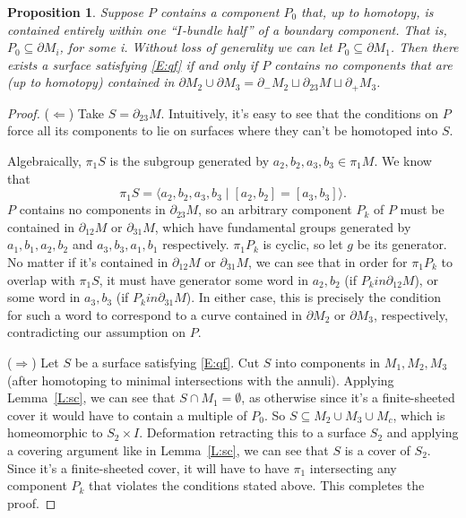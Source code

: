 \documentclass[12pt]{amsart}
\newtheorem{prop}[theorem]{Proposition}
\theoremstyle{definition}
\theoremstyle{remark}
\newcommand{\x}{\times}
\newcommand{\bd}{\partial}
\newcommand{\cin}{\subseteq}
\begin{document}
\begin{prop}

Suppose $P$ contains a component $P_0$ that, up to homotopy, is contained
entirely within one ``$I$-bundle half'' of a boundary component. That is, $P_0
\cin \bd M_i$, for some i. Without loss of generality we can let $P_0 \cin \bd
M_1$.  Then there exists a surface satisfying \eqref{E:qf} if and only if $P$
contains no components that are (up to homotopy) contained in $\bd M_2 \cup \bd
M_3 = \bd_-M_2 \sqcup \bd_{23}M \sqcup \bd_+M_3$.

\end{prop}
\begin{proof}

($\Longleftarrow$) Take $S=\bd_{23}M$. Intuitively, it's easy to see that the
conditions on $P$ force all its components to lie on surfaces where they can't
be homotoped into $S$.

Algebraically, $\pi_1S$ is the subgroup generated by $a_2,b_2,a_3,b_3 \in
\pi_1M$. We know that
\[
\pi_1S = \langle a_2,b_2,a_3,b_3 \mid [a_2,b_2]=[a_3,b_3]\rangle.
\]
$P$ contains no components in $\bd_{23}M$, so an arbitrary component $P_k$ of
$P$ must be contained in $\bd_{12}M$ or $\bd_{31}M$, which have fundamental
groups generated by $a_1,b_1,a_2,b_2$ and $a_3,b_3,a_1,b_1$ respectively.
$\pi_1P_k$ is cyclic, so let $g$ be its generator. No matter if it's contained
in $\bd_{12}M$ or $\bd_{31}M$, we can see that in order for $\pi_1P_k$ to
overlap with $\pi_1S$, it must have generator some word in $a_2,b_2$ (if $P_k
in \bd_{12}M$), or some word in $a_3,b_3$ (if $P_k in \bd_{31}M$). In either
case, this is precisely the condition for such a word to correspond to a curve
contained in $\bd M_2$ or $\bd M_3$, respectively, contradicting our assumption
on $P$.

($\Longrightarrow$) Let $S$ be a surface satisfying \eqref{E:qf}. Cut $S$ into
components in $M_1,M_2,M_3$ (after homotoping to minimal intersections with the
annuli).  Applying Lemma~\ref{L:sc}, we can see that $S \cap M_1 = \emptyset$,
as otherwise since it's a finite-sheeted cover it would have to contain
a multiple of $P_0$.  So $S \cin M_2 \cup M_3 \cup M_c$, which is homeomorphic
to $S_2 \x I$.  Deformation retracting this to a surface $S_2$ and applying
a covering argument like in Lemma~\ref{L:sc}, we can see that $S$ is a cover of
$S_2$.  Since it's a finite-sheeted cover, it will have to have $\pi_1$
intersecting any component $P_k$ that violates the conditions stated above.
This completes the proof.

\end{proof}
\end{document}
